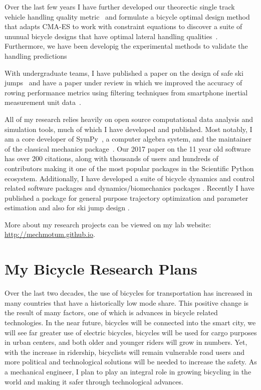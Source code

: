 \documentclass{article}
\begin{document}
Over the last few years I have further developed our theorectic single track
vehicle handling quality metric~\cite{Hess2012} and formulate a bicycle
optimal design method that adapts CMA-ES to work with constraint equations to
discover a suite of ununual bicycle designs that have optimal lateral handling
qualities~\cite{Moore2016,Moore2019a}. Furthermore, we have been developig the
experimental methods to validate the handling
predictions~\cite{Kresie2017,Gilboa2019a}

With undergraduate teams, I have published a paper on the design of safe ski
jumps~\cite{Moore2018} and have a paper under review in which we improved the
accuracy of rowing performance metrics using filtering techniques from
smartphone inertial measurement unit data~\cite{Cloud2019b}.

All of my research relies heavily on open source computational data analysis
and simulation tools, much of which I have developed and published. Most
notably, I am a core developer of SymPy~\cite{SymPyDevelopmentTeam2006}, a
computer algebra system, and the maintainer of the classical mechanics
package~\cite{Gede2013}. Our 2017 paper \cite{Meurer2017} on the 11 year old
software has over 200 citations, along with thousands of users and hundreds of
contributors making it one of the most popular packages in the Scientific
Python ecosystem.  Additionally, I have developed a suite of bicycle dynamics
and control related software packages
\cite{Moore2010b,Moore2011d,Moore2011a,Moore2011e} and dynamics/biomechanics
packages \cite{Dembia2011,Moore2011,Moore2011b} \cite{Moore2013b}
\cite{Moore2017b} \cite{Moore2018a}. Recently I have published a package for
general purpose trajectory optimization and parameter estimation
\cite{Moore2018} and also for ski jump design \cite{Moore2018a}.

More about my research projects can be viewed on my lab website:
\url{http://mechmotum.github.io}.

\section*{My Bicycle Research Plans}
%
Over the last two decades, the use of bicycles for transportation has increased
in many countries that have a historically low mode share. This positive change
is the result of many factors, one of which is advances in bicycle related
technologies. In the near future, bicycles will be connected into the smart
city, we will see far greater use of electric bicycles, bicycles will be used
for cargo purposes in urban centers, and both older and younger riders will
grow in numbers. Yet, with the increase in ridership, bicyclists will remain
vulnerable road users and more political and technological solutions will be
needed to increase the safety. As a mechanical engineer, I plan to play an
integral role in growing bicycling in the world and making it safer through
technological advances.
\end{document}
